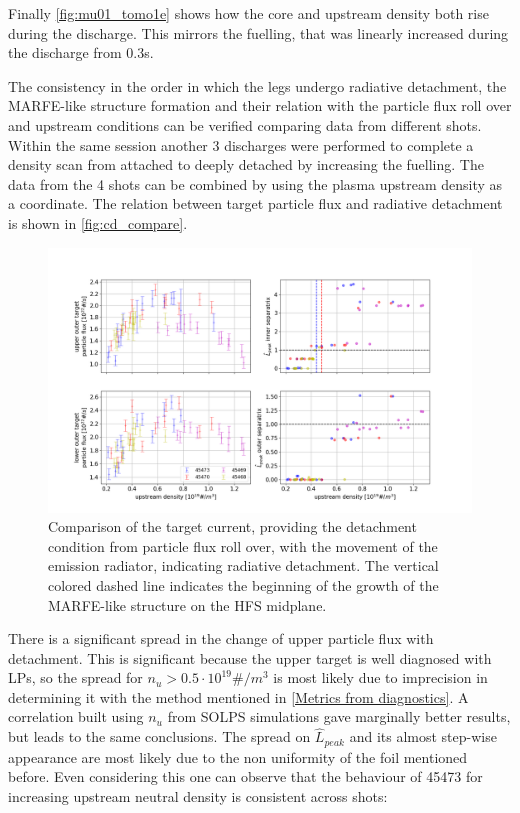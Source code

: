 Finally \autoref{fig:mu01_tomo1e} shows how the core and upstream density both rise during the discharge. This mirrors the fuelling, that was linearly increased during the discharge from 0.3s.


The consistency in the order in which the legs undergo radiative detachment, the MARFE-like structure formation and their relation with the particle flux roll over and upstream conditions can be verified comparing data from different shots. Within the same session another 3 discharges were performed to complete a density scan from attached to deeply detached by increasing the fuelling. The data from the 4 shots can be combined by using the plasma upstream density as a coordinate. The relation between target particle flux and radiative detachment is shown in \autoref{fig:cd_compare}.
\begin{figure}[!ht]
	\centering
	\includegraphics[trim={70 30 110 50},clip,width=\linewidth]{Chapters/chapter2/figs/CD_OH_MU01_compare2.png}
	\caption{Comparison of the target current, providing the detachment condition from particle flux roll over, with the movement of the emission radiator, indicating radiative detachment. The vertical colored dashed line indicates the beginning of the growth of the MARFE-like structure on the HFS midplane.}
	\label{fig:cd_compare}
\end{figure}
There is a significant spread in the change of upper particle flux with detachment. This is significant because the upper target is well diagnosed with LPs, so the spread for $n_u > 0.5\cdot 10^{19} \#/m^3$ is most likely due to imprecision in determining it with the method mentioned in \autoref{Metrics from diagnostics}. A correlation built using $n_u$ from SOLPS simulations gave marginally better results, but leads to the same conclusions. The spread on ${\hat{L}}_{peak}$ and its almost step-wise appearance are most likely due to the non uniformity of the foil mentioned before. Even considering this one can observe that the behaviour of 45473 for increasing upstream neutral density is consistent across shots:
